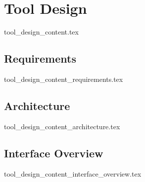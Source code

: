 \chapter{Tool Design}\label{sec:tool_design}
  {tool_design_content.tex}

\section{Requirements}\label{sub:requirements}
  {tool_design_content_requirements.tex}

\section{Architecture}\label{sub:architecture}
  {tool_design_content_architecture.tex}

\section{Interface Overview}\label{sub:interface_overview}
  {tool_design_content_interface_overview.tex}
